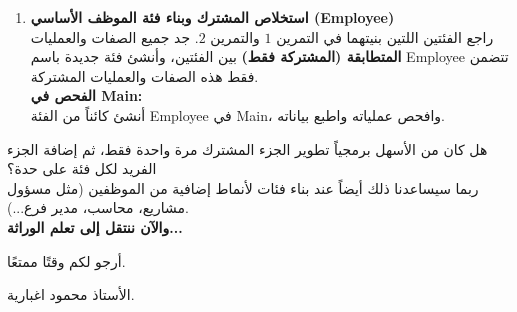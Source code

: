 \documentclass[14pt]{extarticle}
\begin{document}
\begin{enumerate}[label=\textbf{تمرين \arabic*:}, wide=0pt, itemsep=2.2em]
    \item \textbf{استخلاص المشترك وبناء فئة الموظف الأساسي (\textenglish{Employee})} \\
    راجع الفئتين اللتين بنيتهما في التمرين $1$ والتمرين $2$. جد جميع الصفات والعمليات \textbf{المتطابقة (المشتركة فقط)} بين الفئتين، وأنشئ فئة جديدة باسم \textenglish{Employee} تتضمن فقط هذه الصفات والعمليات المشتركة. \\

    \vspace{1em}
    \textbf{الفحص في \textenglish{Main}:} \\
    أنشئ كائناً من الفئة \textenglish{Employee} في \textenglish{Main}، وافحص عملياته واطبع بياناته.
    \filbreak

\end{enumerate}

\begin{boxAttention}
هل كان من الأسهل برمجياً تطوير الجزء المشترك مرة واحدة فقط، ثم إضافة الجزء الفريد لكل فئة على حدة؟ \\
ربما سيساعدنا ذلك أيضاً عند بناء فئات لأنماط إضافية من الموظفين (مثل مسؤول مشاريع، محاسب، مدير فرع...). \\
\textbf{والآن ننتقل إلى تعلم الوراثة...}
\end{boxAttention}

\vspace{1cm}
\begin{flushleft}
أرجو لكم وقتًا ممتعًا.

الأستاذ محمود اغبارية.
\end{flushleft}
\end{document}

